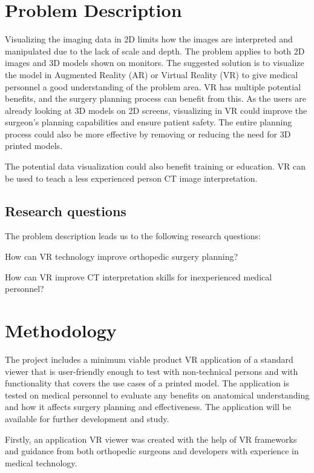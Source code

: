 \documentclass[a4paper]{report}
\begin{document}
\section{Problem Description}
Visualizing the imaging data in 2D limits how the images are interpreted and manipulated due to the lack of scale and depth. The problem applies to both 2D images and 3D models shown on monitors.
The suggested solution is to visualize the model in Augmented Reality (AR) or Virtual Reality (VR) to give medical personnel a good understanding of the problem area.
VR has multiple potential benefits, and the surgery planning process can benefit from this. As the users are already looking at 3D models on 2D screens, visualizing in VR could improve the surgeon's planning capabilities and ensure patient safety.
The entire planning process could also be more effective by removing or reducing the need for 3D printed models.

The potential data visualization could also benefit training or education. VR can be used to teach a less experienced person CT image interpretation.

\subsection{Research questions}
The problem description leads us to the following research questions:

How can VR technology improve orthopedic surgery planning?

How can VR improve CT interpretation skills for inexperienced medical personnel?

\section{Methodology}

The project includes a minimum viable product VR application of a standard viewer that is user-friendly enough to test with non-technical persons and with functionality that covers the use cases of a printed model.
The application is tested on medical personnel to evaluate any benefits on anatomical understanding and how it affects surgery planning and effectiveness. The application will be available for further development and study.

Firstly, an application VR viewer was created with the help of VR frameworks and guidance from both orthopedic surgeons and developers with experience in medical technology.
\end{document}
